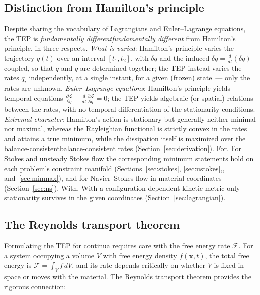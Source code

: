 \documentclass[12pt]{article}
\newif\ifhighlight \highlightfalse
\newif\ifhighlightfirst \highlightfirstfalse
\DeclareRobustCommand{\chg}[1]{\ifhighlight\ifhighlightfirst\textcolor{revised}{#1}\else#1\fi\else#1\fi}
\DeclareRobustCommand{\chgb}[1]{\ifhighlight\textcolor{revisedb}{#1}\else#1\fi}
\begin{document}
\subsection{Distinction from Hamilton's principle}
\label{sec:distinction}

Despite sharing the vocabulary of Lagrangians and Euler--Lagrange equations, the TEP is \chg{\textit{fundamentally different}} from Hamilton's principle, in three respects. \textit{What is varied}: Hamilton's principle varies the trajectory $q(t)$ over an interval $[t_1,t_2]$, with $\delta q$ and the induced $\delta \dot{q} = \frac{d}{dt}(\delta q)$ coupled, so that $q$ and $\dot q$ are determined together; the TEP instead varies the rates $\dot{q}_i$ independently, at a single instant, for a given (frozen) state~--- only the rates are unknown. \textit{Euler--Lagrange equations}: Hamilton's principle yields temporal equations $\frac{\partial \mathscr{L}}{\partial q} - \frac{d}{dt}\frac{\partial \mathscr{L}}{\partial \dot{q}} = 0$; the TEP yields algebraic (or spatial) relations between the rates, with no temporal differentiation of the stationarity conditions. \textit{Extremal character}: Hamilton's action is stationary but generally neither minimal nor maximal, whereas the Rayleighian functional is strictly convex in the rates and attains a true minimum, \chgb{while} the dissipation itself \chgb{is} maximized over the \chg{balance-consistent} rates (Section~\ref{sec:derivation})\chg{. For} Stokes and unsteady Stokes flow the corresponding minimum statements hold on each problem's constraint manifold (Sections~\ref{sec:stokes}, \ref{sec:ustokes}\chg{,} and~\ref{sec:minmax}), and for Navier--Stokes flow in material coordinates (Section~\ref{sec:ns})\chg{. With} a configuration-dependent kinetic metric only stationarity survives in the given coordinates (Section~\ref{sec:lagrangian}).



\subsection{The Reynolds transport theorem}
\label{sec:rtt}

Formulating the TEP for continua requires care with the free energy rate $\dot{\mathcal{F}}$. For a system occupying a volume $V$ with free energy density $f(\boldsymbol{x},t)$, the total free energy is $\mathcal{F} = \int_V f\, dV$, and its rate depends critically on whether $V$ is fixed in space or moves with the material. The Reynolds transport theorem provides the rigorous connection:
\end{document}
